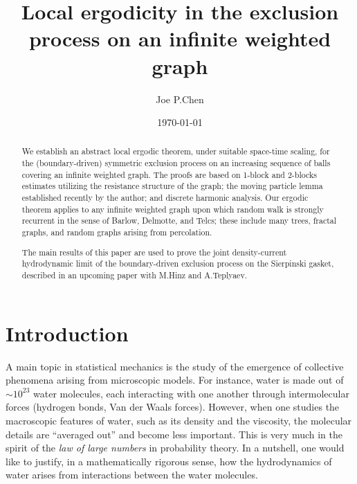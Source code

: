 \documentclass[11pt]{amsart}
\title[Local ergodicity in the exclusion process on an infinite weighted graph]{Local ergodicity in the exclusion process on an infinite weighted graph}
\author{Joe P.\@ Chen}
\date{\today}
\theoremstyle{plain}
\theoremstyle{definition}
\theoremstyle{remark}
\begin{document}


\renewcommand{\theequation}{\thesection.\arabic{equation}}

\maketitle

\begin{abstract}
We establish an abstract local ergodic theorem, under suitable space-time scaling, for the (boundary-driven) symmetric exclusion process on an increasing sequence of balls covering an infinite weighted graph. The proofs are based on 1-block and 2-blocks estimates utilizing the resistance structure of the graph; the moving particle lemma established recently by the author; and discrete harmonic analysis. Our ergodic theorem applies to any infinite weighted graph upon which random walk is strongly recurrent in the sense of Barlow, Delmotte, and Telcs; these include many trees, fractal graphs, and random graphs arising from percolation.

The main results of this paper are used to prove the joint density-current hydrodynamic limit of the boundary-driven exclusion process on the Sierpinski gasket, described in an upcoming paper with M.\@ Hinz and A.\@ Teplyaev.

\tableofcontents
\end{abstract}


\section{Introduction}


A main topic in statistical mechanics is the study of the emergence of collective phenomena arising from microscopic models. For instance, water is made out of $\sim 10^{23}$ water molecules, each interacting with one another through intermolecular forces (hydrogen bonds, Van der Waals forces). However, when one studies the macroscopic features of water, such as its density and the viscosity, the molecular details are ``averaged out'' and become less important. This is very much in the spirit of the \emph{law of large numbers} in probability theory. In a nutshell, one would like to justify, in a mathematically rigorous sense, how the hydrodynamics of water arises from interactions between the water molecules.
\end{document}
